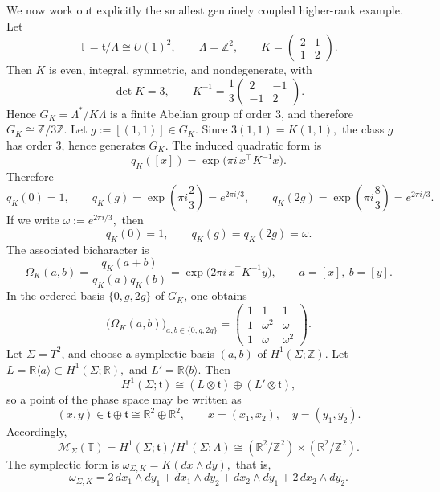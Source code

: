 \documentclass[12pt]{amsart}
\numberwithin{equation}{section}
\begin{document}
We now work out explicitly the smallest genuinely coupled higher-rank example. Let
\[
\mathbb T=\mathfrak t/\Lambda \cong U(1)^2,
\qquad
\Lambda=\mathbb Z^2,
\qquad
K=
\begin{pmatrix}
2&1\\
1&2
\end{pmatrix}.
\]
Then \(K\) is even, integral, symmetric, and nondegenerate, with
\[
\det K=3,
\qquad
K^{-1}=\frac13
\begin{pmatrix}
2&-1\\
-1&2
\end{pmatrix}.
\]
Hence \(G_K=\Lambda^*/K\Lambda\) is a finite Abelian group of order \(3\), and therefore \(G_K\cong \mathbb Z/3\mathbb Z\). Let \(g:=[(1,1)]\in G_K.\)
Since \(3(1,1)=K(1,1),\) the class \(g\) has order \(3\), hence generates \(G_K\). The induced quadratic form is
\[
q_K([x])=\exp\!\bigl(\pi i\,x^{\top}K^{-1}x\bigr).
\]
Therefore
\[
q_K(0)=1,
\qquad
q_K(g)=\exp\!\left(\pi i\frac23\right)=e^{2\pi i/3},
\qquad
q_K(2g)=\exp\!\left(\pi i\frac83\right)=e^{2\pi i/3}.
\]
If we write \(\omega:=e^{2\pi i/3},\) then
\[
q_K(0)=1,
\qquad
q_K(g)=q_K(2g)=\omega.
\]
The associated bicharacter is
\[
\Omega_K(a,b)=\frac{q_K(a+b)}{q_K(a)q_K(b)}
=\exp\!\bigl(2\pi i\,x^{\top}K^{-1}y\bigr),
\qquad a=[x],\ b=[y].
\]
In the ordered basis \(\{0,g,2g\}\) of \(G_K\), one obtains
\[
\bigl(\Omega_K(a,b)\bigr)_{a,b\in\{0,g,2g\}}
=
\begin{pmatrix}
1&1&1\\
1&\omega^2&\omega\\
1&\omega&\omega^2
\end{pmatrix}.
\]
Let \(\Sigma=T^2\), and choose a symplectic basis \((a,b)\) of \(H^1(\Sigma;\mathbb Z)\). Let \(L=\mathbb R\langle a\rangle\subset H^1(\Sigma;\mathbb R),\) and \(L'=\mathbb R\langle b\rangle.\) Then
\[
H^1(\Sigma;\mathfrak t)\cong (L\otimes\mathfrak t)\oplus (L'\otimes\mathfrak t),
\]
so a point of the phase space may be written as
\[
(x,y)\in \mathfrak t\oplus\mathfrak t\cong \mathbb R^2\oplus\mathbb R^2,
\qquad
x=(x_1,x_2),\quad y=(y_1,y_2).
\]
Accordingly,
\[
\mathcal M_\Sigma(\mathbb T)
=
H^1(\Sigma;\mathfrak t)/H^1(\Sigma;\Lambda)
\cong
(\mathbb R^2/\mathbb Z^2)\times (\mathbb R^2/\mathbb Z^2).
\]
The symplectic form is \(\omega_{\Sigma,K}=K(dx\wedge dy),\)
that is,
\[
\omega_{\Sigma,K}
=
2\,dx_1\wedge dy_1
+dx_1\wedge dy_2
+dx_2\wedge dy_1
+2\,dx_2\wedge dy_2.
\]
\end{document}
